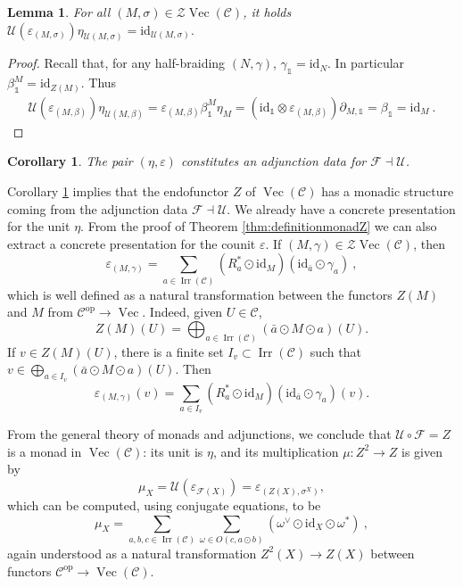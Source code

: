 \documentclass[a4paper,11pt,reqno]{amsart}
\numberwithin{equation}{section}
\newtheorem{corollary}[theorem]{Corollary}
\newtheorem{lemma}[theorem]{Lemma}
\theoremstyle{remark}
\theoremstyle{definition}
\newcommand{\cC}{\mathcal C}
\newcommand{\cF}{\mathcal F}
\newcommand{\cU}{\mathcal U}
\newcommand{\cZ}{\mathcal Z}
\DeclareMathOperator{\Irr}{Irr}
\DeclareMathOperator{\Vect}{Vec}
\newcommand\op{\text{op}}
\newcommand\un{{\mathds 1}}
\newcommand{\id}{\mathrm{id}}
\begin{document}
\begin{lemma}
	For all $(M,\sigma) \in \cZ \Vect(\cC)$, it holds $\cU(\varepsilon_{(M,\sigma)})\eta_{\cU(M,\sigma)} = \id_{\cU(M,\sigma)}$.
\end{lemma}
\begin{proof}
	Recall that, for any half-braiding $(N,\gamma)$, $\gamma_\un = \id_N$. In particular $\beta^M_\un = \id_{Z(M)}$. Thus
	\begin{align*}
		\cU(\varepsilon_{(M,\beta)})\eta_{\cU(M,\beta)} = \varepsilon_{(M,\beta)} \beta^M_\un \eta_M = (\id_\un \otimes \varepsilon_{(M,\beta)}) \partial_{M,\un} = \beta_\un = \id_M \ .
	\end{align*}
\end{proof}

\begin{corollary}
	The pair $(\eta,\varepsilon)$ constitutes an adjunction data for $\cF \dashv \cU$.
	\label{cor:adjunctionbetweenFandU}
\end{corollary}

Corollary \ref{cor:adjunctionbetweenFandU} implies that the endofunctor $Z$ of $\Vect(\cC)$ has a monadic structure coming from the adjunction data $\cF \dashv \cU$. We already have a concrete presentation for the unit $\eta$. From the proof of Theorem \ref{thm:definitionmonadZ} we can also extract a concrete presentation for the counit $\varepsilon$. If $(M,\gamma) \in \cZ \Vect(\cC)$, then
\[
\varepsilon_{(M,\gamma)} = \sum_{a \in \Irr(\cC)} (R_{a}^* \odot \id_M)(\id_{\bar{a}} \odot \gamma_{a}) \ , 
\]
which is well defined as a natural transformation between the functors $Z(M)$ and $M$ from $\cC^{\op} \to \Vect$. Indeed, given $U \in \cC$,
\[Z(M)(U) = \bigoplus_{a\in \Irr(\cC)} (\bar{a} \odot M \odot a) (U) .
\]
If $v \in Z(M)(U)$, there is a finite set $I_v \subset \Irr(\cC)$ such that $v \in \bigoplus_{a \in I_v} (\bar{a} \odot M \odot a) (U)$. Then
\[
\varepsilon_{(M,\gamma)}(v) = \sum_{a \in I_v}(R_{a}^* \odot \id_M)(\id_{\bar{a}} \odot \gamma_{a}) (v).
\]

From the general theory of monads and adjunctions, we conclude that $ \cU \circ \cF = Z$ is a monad in $\Vect(\cC)$: its unit is $\eta$, and its multiplication $\mu: Z^2 \to Z$ is given by
\[
\mu_X = \cU(\varepsilon_{\cF(X)}) = \varepsilon_{(Z(X),\sigma^X)} ,
\]
which can be computed, using conjugate equations, to be
$$\mu_X = \sum_{a,b,c \in \Irr(\cC)} \sum_{\omega \in O(c,a \odot b)} (\omega^\vee \odot \id_X \odot \omega^*) \ ,$$
again understood as a natural transformation $Z^2(X) \to Z(X)$ between functors $\cC^{\op} \to \Vect(\cC)$. 
\end{document}
